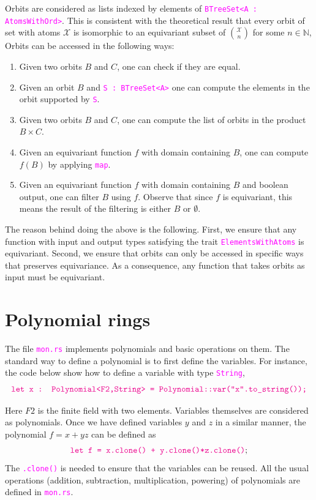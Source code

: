 \documentclass[12pt,a4paper,article]{memoir}
\newcommand{\struct}{\mathcal{X}}
\newcommand{\N}{\mathbb{N}}
\newcommand{\arka}[1]{}
\newcommand{\code}[1]{\texttt{\textcolor{magenta}{#1}}}
\theoremstyle{definition}
\begin{document}
Orbits are considered as lists indexed by elements of
\code{BTreeSet<A : AtomsWithOrd>}.
This is consistent with the theoretical result that every orbit of set with atoms $\struct$ is isomorphic to an equivariant subset of $\binom{\struct}{n}$ for some $n\in\N$,
Orbits can be accessed in the following ways:
\begin{enumerate}
\item Given two orbits $B$ and $C$, one can check if they are equal.
\item Given an orbit $B$ and \code{S : BTreeSet<A>} one can compute the elements in the orbit supported by \code{S}.
\item Given two orbits $B$ and $C$, one can compute the list of orbits in the product $B\times C$.
\item Given an equivariant function $f$ with domain containing $B$,
one can compute $f(B)$ by applying \code{map}.
\item Given an equivariant function $f$ with domain containing $B$ and boolean output,
one can filter $B$ using $f$.
Observe that since $f$ is equivariant, this means the result of the filtering is either $B$ or $\emptyset$.
\end{enumerate}
The reason behind doing the above is the following.
First, we ensure that any function with input and output types satisfying the trait \code{ElementsWithAtoms} is equivariant.
Second, we ensure that orbits can only be accessed in specific ways that preserves equivariance.
As a consequence, any function that takes orbits as input must be equivariant.
%
\section{Polynomial rings}
%
The file \code{mon.rs} implements polynomials and basic operations on them.
The standard way to define a polynomial is to first define the variables.
For instance, the code below show how to define a variable with type \code{String},
\[
\text{\code{let x : Polynomial<F2,String> = Polynomial::var("x".to\_string());}}
\]
\arka{this needs to clearer and more detailed}
Here $F2$ is the finite field with two elements.
Variables themselves are considered as polynomials.
Once we have defined variables $y$ and $z$ in a similar manner,
the polynomial $f = x + yz$ can be defined as
\[
\text{\code{let f = x.clone() + y.clone()*z.clone()}};
\] 
The \code{.clone()} is needed to ensure that the variables can be reused.
All the usual operations (addition, subtraction, multiplication, powering) of polynomials are defined in \code{mon.rs}.
\end{document}
